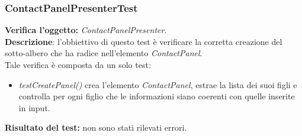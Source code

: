 \subsubsection{ContactPanelPresenterTest}
\textbf{Verifica l'oggetto:} \textit{ContactPanelPresenter}.\\
\textbf{Descrizione}: l'obbiettivo di questo test è verificare la corretta creazione del sotto-albero che ha radice nell'elemento \textit{ContactPanel}.\\
Tale verifica è composta da un solo test:
\begin{itemize}
\item \textit{testCreatePanel() }crea l'elemento \textit{ContactPanel}, estrae la lista dei suoi figli e controlla per ogni figlio che le informazioni siano coerenti con quelle inserite in input.
\end{itemize}
\textbf{Risultato del test:} non sono stati rilevati errori.


